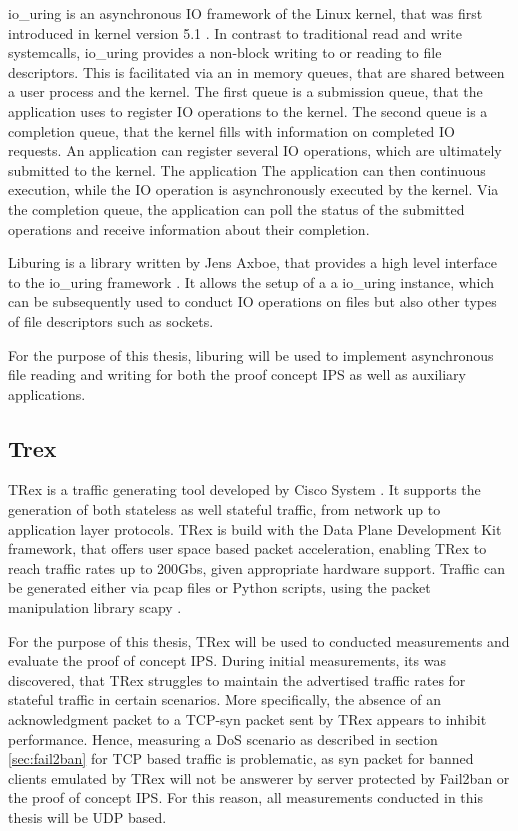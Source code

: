io\_uring is an asynchronous \ac{IO} framework of the Linux kernel, that was first introduced in kernel version 5.1 \cite{io_uring}.
In contrast to traditional read and write systemcalls, io\_uring provides a non-block writing to or reading to
file descriptors. This is facilitated via an in memory queues, that are shared between a user process and the kernel.
The first queue is a submission queue, that the application uses to register \ac{IO} operations to the
kernel. The second queue is a completion queue, that the kernel fills with information on completed \ac{IO} requests.
An application can register several \ac{IO} operations, which are ultimately submitted to the kernel. The application
The application can then continuous execution, while the \ac{IO} operation is asynchronously executed by the kernel.
Via the completion queue, the application can poll the status of the submitted operations
and receive information about their completion.        
\par
Liburing is a library written by Jens Axboe, that provides a high level interface to the io\_uring framework \cite{liburing}.
It allows the setup of a a io\_uring instance, which can be subsequently used to conduct \ac{IO} operations
on files but also other types of file descriptors such as sockets.
\par
For the purpose of this thesis, liburing will be used to implement asynchronous file reading and writing
for both the proof concept \ac{IPS} as well as auxiliary applications. 

\subsection{Trex} \label{sec:trex}

TRex is a traffic generating tool developed by Cisco System \cite{trex}. It supports the generation of both
stateless as well stateful traffic, from network up to application layer protocols. TRex is build with the Data Plane Development Kit framework,
that offers user space based packet acceleration, enabling TRex to reach traffic rates up to 200Gbs, given appropriate hardware support. 
Traffic can be generated either via pcap files or Python scripts, using the packet manipulation library scapy \cite{scapy}.
\par 
For the purpose of this thesis, TRex will be used to conducted measurements and evaluate the proof of concept \ac{IPS}.
During initial measurements, its was discovered, that TRex struggles to maintain the advertised traffic rates for stateful traffic in certain scenarios.
More specifically, the absence of an acknowledgment packet to a \ac{TCP}-syn packet sent by TRex appears to inhibit performance.
Hence, measuring a \ac{DoS} scenario as described in section \ref{sec:fail2ban} for \ac{TCP} based traffic is problematic, as syn packet for banned clients
emulated by TRex will not be answerer by server protected by Fail2ban or the proof of concept \ac{IPS}. For this reason, all measurements conducted in this
thesis will be \ac{UDP} based.

